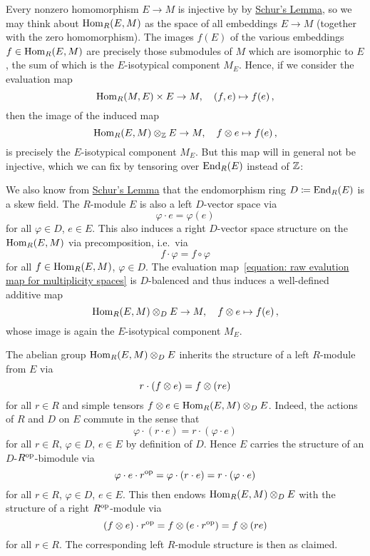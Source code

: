 \begin{fluff}
  \label{fluff: introducting multiplicity spaces}
  Every nonzero homomorphism $E \to M$ is injective by by \hyperref[proposition: schurs lemma for modules]{Schur’s Lemma}, so we may think about $\operatorname{Hom}_R(E,M)$ as the space of all embeddings $E \to M$ (together with the zero homomorphism).
  The images $f(E)$ of the various embeddings $f \in \operatorname{Hom}_R(E,M)$ are precisely those submodules of $M$ which are isomorphic to $E$, the sum of which is the $E$-isotypical component $M_E$.
  Hence, if we consider the evaluation map
  \begin{equation}
    \label{equation: raw evalution map for multiplicity spaces}
            \operatorname{Hom}_R(M,E) \times E
    \to     M,
    \quad   (f, e)
    \mapsto f(e) \,,
  \end{equation}
  then the image of the induced map
  \[            
            \operatorname{Hom}_R(E,M) \mathbin{\otimes}_{\mathbb{Z}} E
    \to     M,
    \quad   f \mathbin{\otimes} e
    \mapsto f(e) \,,
  \]
  is precisely the $E$-isotypical component $M_E$.
  But this map will in general not be injective, which we can fix by tensoring over $\operatorname{End}_R(E)$ instead of $\mathbb{Z}$:
  
  We also know from \hyperref[proposition: schurs lemma for modules]{Schur’s Lemma} that the endomorphism ring $D \coloneqq \operatorname{End}_R(E)$ is a skew field.
  The $R$-module $E$ is also a left $D$-vector space via
  \[
      \varphi \cdot e
    = \varphi(e)
  \]
  for all $\varphi \in D$, $e \in E$.
  This also induces a right $D$-vector space structure on the $\operatorname{Hom}_R(E,M)$ via precomposition, i.e.\ via
  \[
      f \cdot \varphi
    = f \circ \varphi
  \]
  for all $f \in \operatorname{Hom}_R(E,M)$, $\varphi \in D$.
  The evaluation map~\eqref{equation: raw evalution map for multiplicity spaces} is $D$-balenced and thus induces a well-defined additive map
  \[
            \operatorname{Hom}_R(E,M) \mathbin{\otimes}_D E
    \to     M,
    \quad   f \mathbin{\otimes} e
    \mapsto f(e) \,,
  \]
  whose image is again the $E$-isotypical component $M_E$.
  
  The abelian group $\operatorname{Hom}_R(E,M) \mathbin{\otimes}_D E$ inherits the structure of a left $R$-module from $E$ via
  \[
      r \cdot (f \mathbin{\otimes} e)
    = f \mathbin{\otimes} (r e)
  \]
  for all $r \in R$ and simple tensors $f \mathbin{\otimes} e \in \operatorname{Hom}_R(E,M) \mathbin{\otimes}_D E$.
  Indeed, the actions of $R$ and $D$ on $E$ commute in the sense that
  \[
      \varphi \cdot (r \cdot e)
    = r \cdot (\varphi \cdot e)
  \]
  for all $r \in R$, $\varphi \in D$, $e \in E$ by definition of $D$.
  Hence $E$ carries the structure of an $D$-$R^{\operatorname{op}}$-bimodule via
  \[
      \varphi \cdot e \cdot r^{\operatorname{op}}
    = \varphi \cdot (r \cdot e)
    = r \cdot (\varphi \cdot e)
  \]
  for all $r \in R$, $\varphi \in D$, $e \in E$.
  This then endows $\operatorname{Hom}_R(E,M) \mathbin{\otimes}_D E$ with the structure of a right $R^{\operatorname{op}}$-module via
  \[
      (f \mathbin{\otimes} e) \cdot r^{\operatorname{op}}
    = f \mathbin{\otimes} (e \cdot r^{\operatorname{op}})
    = f \mathbin{\otimes} (r e)
  \]
  for all $r \in R$.
  The corresponding left $R$-module structure is then as claimed.
\end{fluff}



